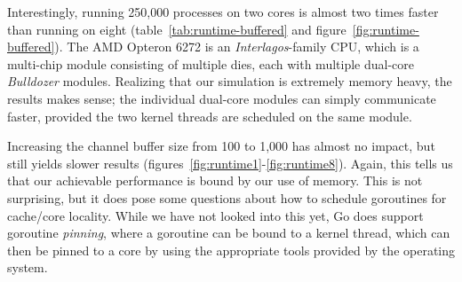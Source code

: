 Interestingly, running 250,000 processes on two cores is almost two times faster
than running on eight (table~\ref{tab:runtime-buffered} and figure~\ref{fig:runtime-buffered}). The AMD Opteron
6272 is an \emph{Interlagos}-family CPU, which is a multi-chip module
consisting of multiple dies, each with multiple dual-core \emph{Bulldozer}
modules\cite{amd-interlagos}. Realizing that our
simulation is extremely memory heavy, the results makes sense; the individual
dual-core modules can simply communicate faster, provided the two kernel
threads are scheduled on the same module.

Increasing the channel buffer size from 100 to 1,000 has almost no impact, but
still yields slower results (figures~\ref{fig:runtime1}-\ref{fig:runtime8}).
Again, this tells us that our achievable performance is bound by
our use of memory. This is not surprising, but it does pose some questions
about how to schedule goroutines for cache/core locality. While we have not
looked into this yet, Go does support goroutine \emph{pinning}, where a
goroutine can be bound to a kernel thread, which can then be pinned to a core
by using the appropriate tools provided by the operating system.
